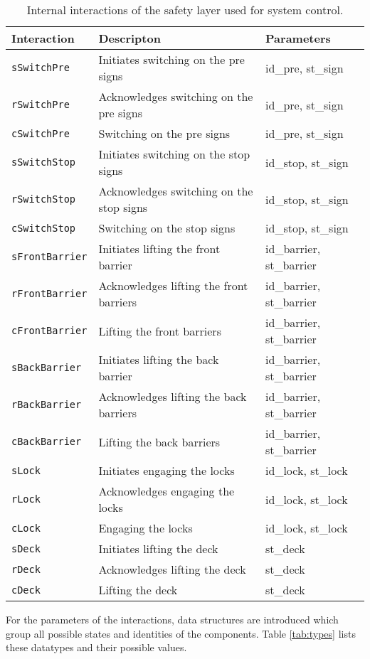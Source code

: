 %
\begin{table}%
\begin{tabular}{lll}
			\textbf{Interaction} &	\textbf{Descripton}	&	\textbf{Parameters}\\
  		\hline
  		
			\texttt{sSwitchPre} & Initiates switching on the pre signs & id\_pre, st\_sign\\
      \texttt{rSwitchPre} & Acknowledges switching on the pre signs & id\_pre, st\_sign\\
      \texttt{cSwitchPre} & Switching on the pre signs & id\_pre, st\_sign\\
            
      \texttt{sSwitchStop} & Initiates switching on the stop signs & id\_stop, st\_sign\\
      \texttt{rSwitchStop} & Acknowledges switching on the stop signs & id\_stop, st\_sign\\
      \texttt{cSwitchStop} & Switching on the stop signs & id\_stop, st\_sign\\
            
      \texttt{sFrontBarrier} & Initiates lifting the front barrier & id\_barrier, st\_barrier\\
      \texttt{rFrontBarrier} & Acknowledges lifting the front barriers & id\_barrier, st\_barrier\\
      \texttt{cFrontBarrier} & Lifting the front barriers & id\_barrier, st\_barrier\\
      
      \texttt{sBackBarrier} & Initiates lifting the back barrier & id\_barrier, st\_barrier\\
      \texttt{rBackBarrier} & Acknowledges lifting the back barriers & id\_barrier, st\_barrier\\
      \texttt{cBackBarrier} & Lifting the back barriers & id\_barrier, st\_barrier\\
      
      \texttt{sLock} & Initiates engaging the locks & id\_lock, st\_lock\\
      \texttt{rLock} & Acknowledges engaging the locks & id\_lock, st\_lock\\
      \texttt{cLock} & Engaging the locks & id\_lock, st\_lock\\
      
      \texttt{sDeck} & Initiates lifting the deck & st\_deck\\
      \texttt{rDeck} & Acknowledges lifting the deck & st\_deck\\
      \texttt{cDeck} & Lifting the deck & st\_deck\\
\end{tabular}
\caption{Internal interactions of the safety layer used for system control.}
\label{tab:tau}
\end{table}
%
For the parameters of the interactions, data structures are introduced which group all possible states and identities of the components. Table \ref{tab:types} lists these datatypes and their possible values.


